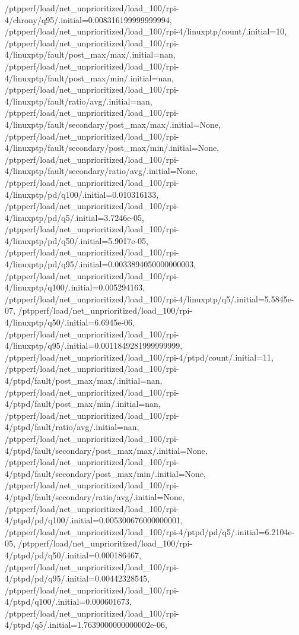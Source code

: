 {    /ptpperf/load/net_unprioritized/load_100/rpi-4/chrony/q95/.initial=0.008316199999999994,
    /ptpperf/load/net_unprioritized/load_100/rpi-4/linuxptp/count/.initial=10,
    /ptpperf/load/net_unprioritized/load_100/rpi-4/linuxptp/fault/post_max/max/.initial=nan,
    /ptpperf/load/net_unprioritized/load_100/rpi-4/linuxptp/fault/post_max/min/.initial=nan,
    /ptpperf/load/net_unprioritized/load_100/rpi-4/linuxptp/fault/ratio/avg/.initial=nan,
    /ptpperf/load/net_unprioritized/load_100/rpi-4/linuxptp/fault/secondary/post_max/max/.initial=None,
    /ptpperf/load/net_unprioritized/load_100/rpi-4/linuxptp/fault/secondary/post_max/min/.initial=None,
    /ptpperf/load/net_unprioritized/load_100/rpi-4/linuxptp/fault/secondary/ratio/avg/.initial=None,
    /ptpperf/load/net_unprioritized/load_100/rpi-4/linuxptp/pd/q100/.initial=0.010316133,
    /ptpperf/load/net_unprioritized/load_100/rpi-4/linuxptp/pd/q5/.initial=3.7246e-05,
    /ptpperf/load/net_unprioritized/load_100/rpi-4/linuxptp/pd/q50/.initial=5.9017e-05,
    /ptpperf/load/net_unprioritized/load_100/rpi-4/linuxptp/pd/q95/.initial=0.0033894050000000003,
    /ptpperf/load/net_unprioritized/load_100/rpi-4/linuxptp/q100/.initial=0.005294163,
    /ptpperf/load/net_unprioritized/load_100/rpi-4/linuxptp/q5/.initial=5.5845e-07,
    /ptpperf/load/net_unprioritized/load_100/rpi-4/linuxptp/q50/.initial=6.6945e-06,
    /ptpperf/load/net_unprioritized/load_100/rpi-4/linuxptp/q95/.initial=0.0011849281999999999,
    /ptpperf/load/net_unprioritized/load_100/rpi-4/ptpd/count/.initial=11,
    /ptpperf/load/net_unprioritized/load_100/rpi-4/ptpd/fault/post_max/max/.initial=nan,
    /ptpperf/load/net_unprioritized/load_100/rpi-4/ptpd/fault/post_max/min/.initial=nan,
    /ptpperf/load/net_unprioritized/load_100/rpi-4/ptpd/fault/ratio/avg/.initial=nan,
    /ptpperf/load/net_unprioritized/load_100/rpi-4/ptpd/fault/secondary/post_max/max/.initial=None,
    /ptpperf/load/net_unprioritized/load_100/rpi-4/ptpd/fault/secondary/post_max/min/.initial=None,
    /ptpperf/load/net_unprioritized/load_100/rpi-4/ptpd/fault/secondary/ratio/avg/.initial=None,
    /ptpperf/load/net_unprioritized/load_100/rpi-4/ptpd/pd/q100/.initial=0.005300676000000001,
    /ptpperf/load/net_unprioritized/load_100/rpi-4/ptpd/pd/q5/.initial=6.2104e-05,
    /ptpperf/load/net_unprioritized/load_100/rpi-4/ptpd/pd/q50/.initial=0.000186467,
    /ptpperf/load/net_unprioritized/load_100/rpi-4/ptpd/pd/q95/.initial=0.00442328545,
    /ptpperf/load/net_unprioritized/load_100/rpi-4/ptpd/q100/.initial=0.000601673,
    /ptpperf/load/net_unprioritized/load_100/rpi-4/ptpd/q5/.initial=1.7639000000000002e-06,
}
